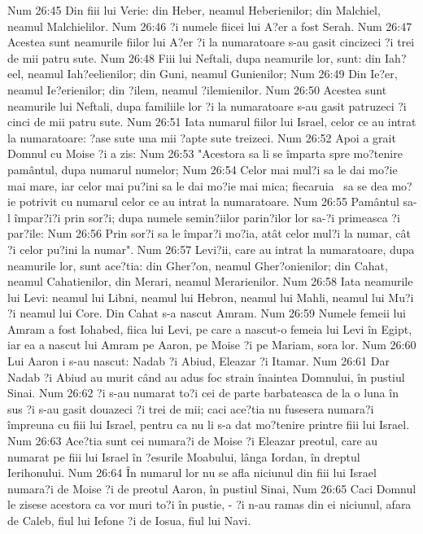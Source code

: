Num 26:45  Din fiii lui Verie: din Heber, neamul Heberienilor; din Malchiel, neamul Malchielilor.
Num 26:46  ?i numele fiicei lui A?er a fost Serah.
Num 26:47  Acestea sunt neamurile fiilor lui A?er ?i la numaratoare s-au gasit cincizeci ?i trei de mii patru sute.
Num 26:48  Fiii lui Neftali, dupa neamurile lor, sunt: din Iah?eel, neamul Iah?eelienilor; din Guni, neamul Gunienilor;
Num 26:49  Din Ie?er, neamul Ie?erienilor; din ?ilem, neamul ?ilemienilor.
Num 26:50  Acestea sunt neamurile lui Neftali, dupa familiile lor ?i la numaratoare s-au gasit patruzeci ?i cinci de mii patru sute.
Num 26:51  Iata numarul fiilor lui Israel, celor ce au intrat la numaratoare: ?ase sute una mii ?apte sute treizeci.
Num 26:52  Apoi a grait Domnul cu Moise ?i a zis:
Num 26:53  "Acestora sa li se împarta spre mo?tenire pamântul, dupa numarul numelor;
Num 26:54  Celor mai mul?i sa le dai mo?ie mai mare, iar celor mai pu?ini sa le dai mo?ie mai mica; fiecaruia  sa se dea mo?ie potrivit cu numarul celor ce au intrat la numaratoare.
Num 26:55  Pamântul sa-l împar?i?i prin sor?i; dupa numele semin?iilor parin?ilor lor sa-?i primeasca ?i par?ile:
Num 26:56  Prin sor?i sa le împar?i mo?ia, atât celor mul?i la numar, cât ?i celor pu?ini la numar".
Num 26:57  Levi?ii, care au intrat la numaratoare, dupa neamurile lor, sunt ace?tia: din Gher?on, neamul Gher?onienilor; din Cahat, neamul Cahatienilor, din Merari, neamul Merarienilor.
Num 26:58  Iata neamurile lui Levi: neamul lui Libni, neamul lui Hebron, neamul lui Mahli, neamul lui Mu?i ?i neamul lui Core. Din Cahat s-a nascut Amram.
Num 26:59  Numele femeii lui Amram a fost Iohabed, fiica lui Levi, pe care a nascut-o femeia lui Levi în Egipt, iar ea a nascut lui Amram pe Aaron, pe Moise ?i pe Mariam, sora lor.
Num 26:60  Lui Aaron i s-au nascut: Nadab ?i Abiud, Eleazar ?i Itamar.
Num 26:61  Dar Nadab ?i Abiud au murit când au adus foc strain înaintea Domnului, în pustiul Sinai.
Num 26:62  ?i s-au numarat to?i cei de parte barbateasca de la o luna în sus ?i s-au gasit douazeci ?i trei de mii; caci ace?tia nu fusesera numara?i împreuna cu fiii lui Israel, pentru ca nu li s-a dat mo?tenire printre fiii lui Israel.
Num 26:63  Ace?tia sunt cei numara?i de Moise ?i Eleazar preotul, care au numarat pe fiii lui Israel în ?esurile Moabului, lânga Iordan, în dreptul Ierihonului.
Num 26:64  În numarul lor nu se afla niciunul din fiii lui Israel numara?i de Moise ?i de preotul Aaron, în pustiul Sinai,
Num 26:65  Caci Domnul le zisese acestora ca vor muri to?i în pustie, - ?i n-au ramas din ei niciunul, afara de Caleb, fiul lui Iefone ?i de Iosua, fiul lui Navi.
